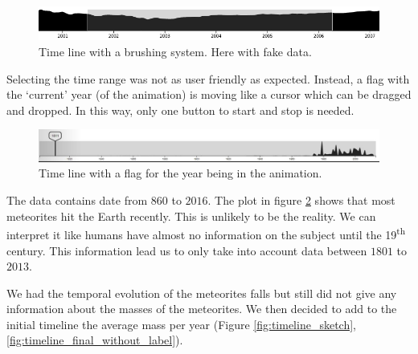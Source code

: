 \documentclass[10pt,conference,compsocconf]{IEEEtran}
\begin{document}
\begin{figure}[H]
  \centering
  \includegraphics[width=\columnwidth]{images/timeline_brush.png}
  \vspace{-3mm}
  \caption{Time line with a brushing system. Here with fake data.}
  \label{fig:timeline_brush}
\end{figure}

Selecting the time range was not as user friendly as expected. Instead, a flag with the `current' year (of the animation) is moving like a cursor which can be dragged and dropped. In this way, only one button to start and stop is needed.

\begin{figure}[H]
  \centering
  \includegraphics[width=\columnwidth]{images/timeline_original.jpg}
  \vspace{-3mm}
  \caption{Time line with a flag for the year being in the animation.}
  \label{fig:timeline_all_dates}
\end{figure}

The data contains date from $860$ to $2016$. The plot in figure \ref{fig:timeline_all_dates} shows that most meteorites hit the Earth recently. This is unlikely to be the reality. We can interpret it like humans have almost no information on the subject until the 19\textsuperscript{th} century. This information lead us to only take into account data between $1801$ to $2013$.

We had the temporal evolution of the meteorites falls but still did not give any information about the masses of the meteorites. We then decided to add to the initial timeline the average mass per year (Figure \ref{fig:timeline_sketch},\ref{fig:timeline_final_without_label}).
\end{document}
